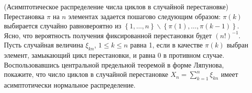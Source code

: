 \begin{problem}(Асимптотическое распределение числа циклов в случайной перестановке)
\label{permutation}
Перестановка $\pi $ на $n$ элементах задается пошагово следующим образом: $\pi (k)$ выбирается случайно равновероятно из $\left\{1,\ldots ,n\right\}\backslash \left\{\pi (1),\ldots ,\pi (k-1)\right\}$. Ясно, что вероятность получения фиксированной перестановки будет $(n!)^{-1} $. Пусть случайная величина $\xi _{kn} $, $1\le k\le n$ равна 1, если в качестве $\pi (k)$ выбран элемент, замыкающий цикл перестановки, и равна 0 в противном случае. Воспользовавшись центральной предельной теоремой в форме Ляпунова, покажите, что  число циклов в случайной перестановке $X_{n} =\sum _{k=1}^{n}\xi _{kn} $  имеет асимптотически нормальное распределение.
\end{problem}

